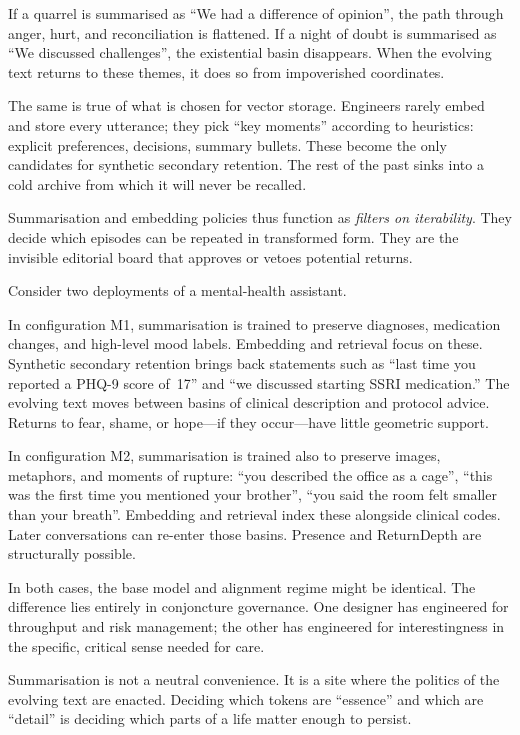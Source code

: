 \documentclass[12pt,a4paper]{article}
\begin{document}
If a quarrel is summarised as ``We had a difference of opinion'', the path through anger, hurt, and reconciliation is flattened. If a night of doubt is summarised as ``We discussed challenges'', the existential basin disappears. When the evolving text returns to these themes, it does so from impoverished coordinates.

The same is true of what is chosen for vector storage. Engineers rarely embed and store every utterance; they pick ``key moments'' according to heuristics: explicit preferences, decisions, summary bullets. These become the only candidates for synthetic secondary retention. The rest of the past sinks into a cold archive from which it will never be recalled.

Summarisation and embedding policies thus function as \emph{filters on iterability}. They decide which episodes can be repeated in transformed form. They are the invisible editorial board that approves or vetoes potential returns.

Consider two deployments of a mental-health assistant.

In configuration M1, summarisation is trained to preserve diagnoses, medication changes, and high-level mood labels. Embedding and retrieval focus on these. Synthetic secondary retention brings back statements such as ``last time you reported a PHQ-9 score of~17'' and ``we discussed starting SSRI medication.'' The evolving text moves between basins of clinical description and protocol advice. Returns to fear, shame, or hope---if they occur---have little geometric support.

In configuration M2, summarisation is trained also to preserve images, metaphors, and moments of rupture: ``you described the office as a cage'', ``this was the first time you mentioned your brother'', ``you said the room felt smaller than your breath''. Embedding and retrieval index these alongside clinical codes. Later conversations can re-enter those basins. Presence and ReturnDepth are structurally possible.

In both cases, the base model and alignment regime might be identical. The difference lies entirely in conjoncture governance. One designer has engineered for throughput and risk management; the other has engineered for interestingness in the specific, critical sense needed for care.

Summarisation is not a neutral convenience. It is a site where the politics of the evolving text are enacted. Deciding which tokens are ``essence'' and which are ``detail'' is deciding which parts of a life matter enough to persist.
\end{document}
